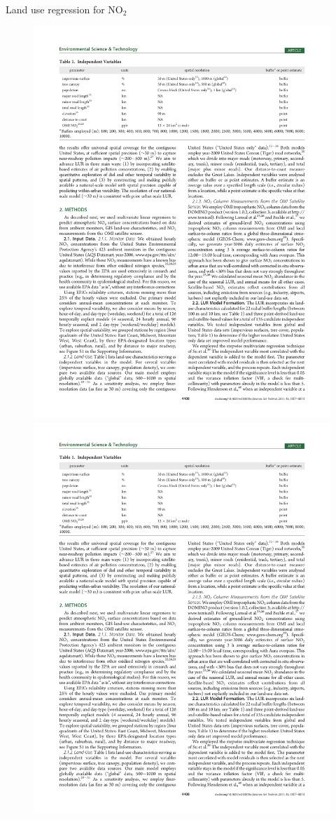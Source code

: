 \documentclass[aspectratio=169]{beamer}
\begin{document}
\begin{frame}{Land use regression for NO$_2$}
\begin{figure}
\includegraphics[height=0.6\textheight]{novotny_tab1_2}
\includegraphics[height=0.6\textheight]{novotny_tab1_3}

\end{figure}
\end{frame}
\end{document}
